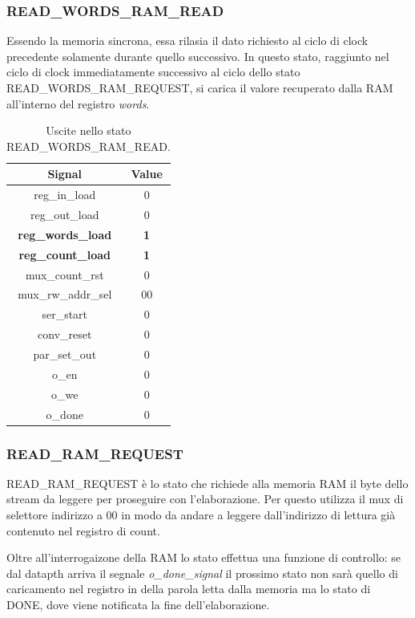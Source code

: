 \documentclass[a4paper]{report}
\begin{document}
\subsubsection{READ\_WORDS\_RAM\_READ}
Essendo la memoria sincrona, essa rilasia il dato richiesto al ciclo di clock precedente solamente durante quello successivo. In questo stato, raggiunto nel ciclo di clock immediatamente successivo al ciclo dello stato READ\_WORDS\_RAM\_REQUEST, si carica il valore recuperato dalla RAM all'interno del registro \textit{words}.
\begin{table}[H]
  \centering
  \begin{tabular}{||c | c||} 
    \hline
    Signal & Value \\
    \hline\hline
    reg\_in\_load & 0 \\
    reg\_out\_load & 0 \\
    \textbf{reg\_words\_load} & \textbf{1} \\
    \textbf{reg\_count\_load} & \textbf{1} \\
    mux\_count\_rst & 0 \\
    mux\_rw\_addr\_sel & 00 \\
    ser\_start & 0 \\
    conv\_reset & 0 \\
    par\_set\_out & 0 \\
    o\_en & 0 \\
    o\_we & 0 \\
    o\_done & 0 \\
   \hline
  \end{tabular}
  \caption{Uscite nello stato READ\_WORDS\_RAM\_READ.}
  \label{table:3}
\end{table}

\subsubsection{READ\_RAM\_REQUEST}
READ\_RAM\_REQUEST è lo stato che richiede alla memoria RAM il byte dello stream da leggere per proseguire con l'elaborazione. Per questo utilizza il mux di selettore indirizzo a 00 in modo da andare a leggere dall'indirizzo di lettura già contenuto nel registro di count. 

Oltre all'interrogaizone della RAM lo stato effettua una funzione di controllo: se dal datapth arriva il segnale \textit{o\_done\_signal} il prossimo stato non sarà quello di caricamento nel registro in della parola letta dalla memoria ma lo stato di DONE, dove viene notificata la fine dell'elaborazione.
\end{document}

